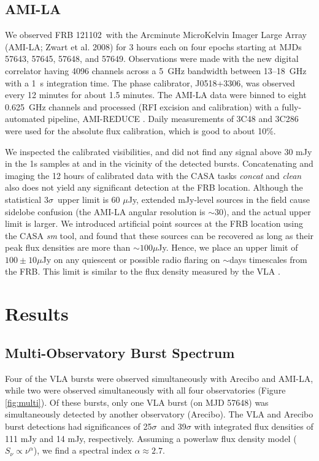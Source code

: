 \documentclass[twocolumn]{aastex61}
\newcommand{\frb}{FRB 121102}
\begin{document}
\subsection{AMI-LA}

We observed \frb\ with the Arcminute MicroKelvin Imager Large Array (AMI-LA; Zwart et al. 2008) for 3 hours each on four epochs starting at MJDs 57643, 57645, 57648, and 57649. Observations were made with the new digital correlator having 4096 channels across a 5~GHz bandwidth between 13--18~GHz with a 1~s integration time. The phase calibrator, J0518+3306, was observed every 12 minutes for about 1.5 minutes. The AMI-LA data were binned to eight 0.625~GHz channels and processed (RFI excision and calibration) with a fully-automated pipeline, AMI-REDUCE \citep[e.g.,][]{2013MNRAS.429.3330P}. Daily measurements of 3C48 and 3C286 were used for the absolute flux calibration, which is good to about 10\%. 

We inspected the calibrated visibilities, and did not find any signal above 30 mJy in the 1s samples at and in the vicinity of the detected bursts. Concatenating and imaging the 12 hours of calibrated data with the CASA tasks {\it concat} and {\it clean} also does not yield any significant detection at the FRB location. Although the statistical $3\sigma$\ upper limit is 60 $\mu$Jy, extended mJy-level sources in the field cause sidelobe confusion (the AMI-LA angular resolution is $\sim$30\arcsec), and the actual upper limit is larger. We introduced artificial point sources at the FRB location using the CASA {\it sm} tool, and found that these sources can be recovered as long as their peak flux densities are more than $\sim100\mu$Jy. Hence, we place an upper limit of $100\pm10 \mu$Jy on any quiescent or possible radio flaring on $\sim$days timescales from the FRB. This limit is similar to the flux density measured by the VLA \citep{LOC}.

\section{Results}

\subsection{Multi-Observatory Burst Spectrum}
Four of the VLA bursts were observed simultaneously with Arecibo and AMI-LA, while two were observed simultaneously with all four observatories (Figure \ref{fig:multi}). Of these bursts, only one VLA burst (on MJD 57648) was simultaneously detected by another observatory (Arecibo). The VLA and Arecibo burst detections had significances of 25$\sigma$\ and 39$\sigma$ with integrated flux densities of 111 mJy and 14 mJy, respectively. Assuming a powerlaw flux density model ($S_{\nu} \propto \nu^{\alpha}$), we find a spectral index $\alpha\approx2.7$. 
\end{document}
